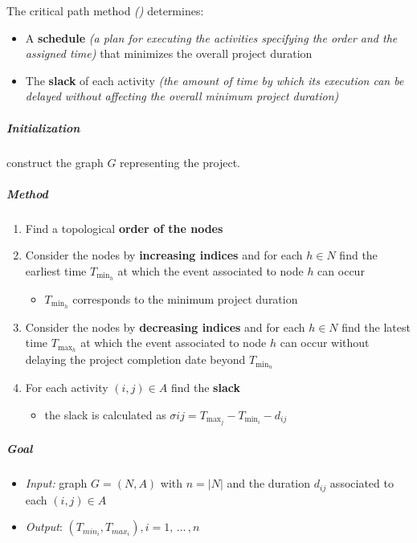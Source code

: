 \documentclass[english]{article}
\begin{document}
The critical path method \textit{(\CPM) } determines:

\begin{itemize}
  \item A \textbf{schedule} \textit{(a plan for executing the activities specifying the order and the assigned time)} that minimizes the overall project duration
  \item The \textbf{slack} of each activity \textit{(the amount of time by which its execution can be delayed without affecting the overall minimum project duration)}
\end{itemize}

\subparagraph*{Initialization}
construct the graph \(G\) representing the project.

\subparagraph*{Method}

\begin{enumerate}
  \item Find a topological \textbf{order of the nodes}
  \item Consider the nodes by \textbf{increasing indices} and for each \(h \in N\) find the earliest time \(T_{\min_h}\) at which the event associated to node \(h\) can occur
        \begin{itemize}[label = \(\rightarrow\)]
          \item \(T_{\min_h}\) corresponds to the minimum project duration
        \end{itemize}
  \item Consider the nodes by \textbf{decreasing indices} and for each \(h \in N\) find the latest time \(T_{\max_h}\) at which the event associated to node \(h\) can occur without delaying the project completion date beyond \(T_{\min_n}\)
  \item For each activity \(\left( i, j \right) \in A\) find the \textbf{slack}
        \begin{itemize}[label = \(\rightarrow\)]
          \item the slack is calculated as \(\sigma{ij} = T_{\max_j} - T_{\min_i} - d_{ij}\)
        \end{itemize}
\end{enumerate}

\subparagraph*{Goal}
\begin{itemize}[label=\(\rightarrow\)]
  \item \textit{Input:} graph \(G = (N, A)\) with \(n = |N|\) and the duration \(d_{ij}\) associated to each \(\left( i, j \right) \in A\)
  \item \textit{Output}: \(\left( T_{min_i}, T_{max_i} \right), i = 1, \, \ldots \,, n\)
\end{itemize}
\end{document}
